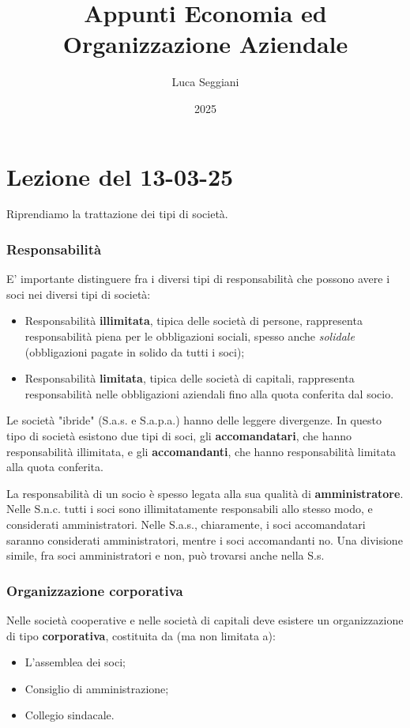 \documentclass[a4paper,11pt]{article}
\title{Appunti Economia ed Organizzazione Aziendale}
\author{Luca Seggiani}
\date{2025}
\begin{document}
\section{Lezione del 13-03-25}

\thispagestyle{empty}
\pagestyle{fancy}

Riprendiamo la trattazione dei tipi di società.

\subsubsection{Responsabilità}
E' importante distinguere fra i diversi tipi di responsabilità che possono avere i soci nei diversi tipi di società:
\begin{itemize}
	\item Responsabilità \textbf{illimitata}, tipica delle società di persone, rappresenta responsabilità piena per le obbligazioni sociali, spesso anche \textit{solidale} (obbligazioni pagate in solido da tutti i soci);
	\item Responsabilità \textbf{limitata}, tipica delle società di capitali, rappresenta responsabilità nelle obbligazioni aziendali fino alla quota conferita dal socio.
\end{itemize}

Le società "ibride" (S.a.s. e S.a.p.a.) hanno delle leggere divergenze.
In questo tipo di società esistono due tipi di soci, gli \textbf{accomandatari}, che hanno responsabilità illimitata, e gli \textbf{accomandanti}, che hanno responsabilità limitata alla quota conferita.

La responsabilità di un socio è spesso legata alla sua qualità di \textbf{amministratore}.
Nelle S.n.c. tutti i soci sono illimitatamente responsabili allo stesso modo, e considerati amministratori. 
Nelle S.a.s., chiaramente, i soci accomandatari saranno considerati amministratori, mentre i soci accomandanti no.
Una divisione simile, fra soci amministratori e non, può trovarsi anche nella S.s.

\subsubsection{Organizzazione corporativa}
Nelle società cooperative e nelle società di capitali deve esistere un organizzazione di tipo \textbf{corporativa}, costituita da (ma non limitata a):
\begin{itemize}
	\item L'assemblea dei soci;
	\item Consiglio di amministrazione;
	\item Collegio sindacale.
\end{itemize}
\end{document}
